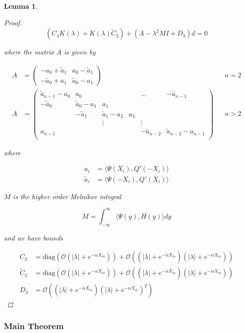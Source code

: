 \documentclass[12pt]{article}
\newtheorem{lemma}{Lemma}
\begin{document}
\begin{lemma}
\begin{proof}
\[
(C_3 K(\lambda) + K(\lambda) \tilde{C}_3)  + (A - \lambda^2 M I + D_3)d = 0
\]

where the matrix $A$ is given by

\begin{align*}
A &= \begin{pmatrix}
-a_0 + \tilde{a}_1 & a_0 - \tilde{a}_1 \\
-\tilde{a}_0 + a_1 & \tilde{a}_0 - a_1
\end{pmatrix} && n = 2 \\
A &= \begin{pmatrix}
\tilde{a}_{n-1} - a_0 & a_0 & & & \dots & -\tilde{a}_{n-1}\\
-\tilde{a}_0 & \tilde{a}_0 - a_1 &  a_1 \\
& -\tilde{a}_1 & \tilde{a}_1 - a_2 &  a_2 \\
& & \vdots & & \vdots \\
a_{n-1} & & & & -\tilde{a}_{n-2} & \tilde{a}_{n-2} - a_{n-1} \\
\end{pmatrix} && n > 2
\end{align*}

where

\begin{align*}
a_i &= \langle \Psi(X_i), Q'(-X_i) \rangle \\
\tilde{a}_i &= \langle \Psi(-X_i), Q'(X_i) \rangle
\end{align*}

$M$ is the higher order Melnikov integral

\[
M = \int_{-\infty}^\infty \langle \Psi(y), H(y) \rangle dy
\]

and we have bounds

\begin{align*}
C_3 &= \text{diag}(\mathcal{O}(|\lambda| + e^{-\alpha X_m})) 
+ \mathcal{O}((|\lambda| + e^{-\tilde{\alpha} X_m})( |\lambda| + e^{-\alpha X_m})) \\
\tilde{C}_3 &= \text{diag}(\mathcal{O}(|\lambda| + e^{-\alpha X_m})) 
+ \mathcal{O}((|\lambda| + e^{-\tilde{\alpha} X_m})( |\lambda| + e^{-\alpha X_m})) \\
D_3 &= \mathcal{O}((|\lambda| + e^{-\tilde{\alpha} X_m})(|\lambda| + e^{-\alpha X_m})^2)
\end{align*}

\end{proof}
\end{lemma}

\subsubsection{Main Theorem}
\end{document}
